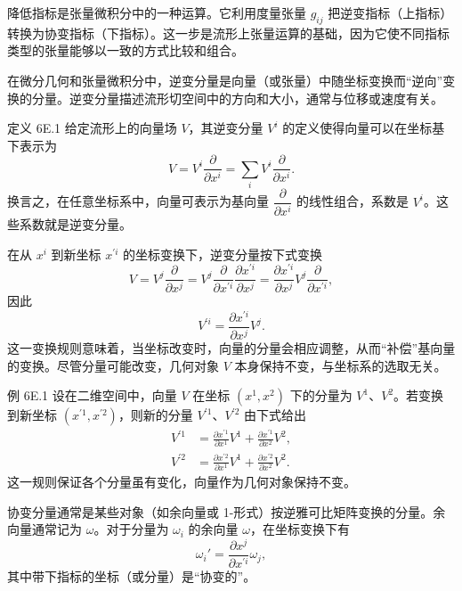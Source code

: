 降低指标是张量微积分中的一种运算。它利用度量张量 $g_{ij}$ 把逆变指标（上指标）转换为协变指标（下指标）。这一步是流形上张量运算的基础，因为它使不同指标类型的张量能够以一致的方式比较和组合。

在微分几何和张量微积分中，逆变分量是向量（或张量）中随坐标变换而“逆向”变换的分量。逆变分量描述流形切空间中的方向和大小，通常与位移或速度有关。

\begin{statement}{定义 6E.1}{}
给定流形上的向量场 $V$，其逆变分量 $V^i$ 的定义使得向量可以在坐标基下表示为
\[
  V=V^i\frac{\partial}{\partial x^i}
    =\sum_i V^i\frac{\partial}{\partial x^i}.
\]
换言之，在任意坐标系中，向量可表示为基向量 $\dfrac{\partial}{\partial x^i}$ 的线性组合，系数是 $V^i$。这些系数就是逆变分量。

在从 $x^i$ 到新坐标 $x^{\prime i}$ 的坐标变换下，逆变分量按下式变换
\[
 V=V^j\frac{\partial}{\partial x^j}
   =V^j\frac{\partial}{\partial x^{\prime i}}
          \frac{\partial x^{\prime i}}{\partial x^j}
   =\frac{\partial x^{\prime i}}{\partial x^j}V^j
        \frac{\partial}{\partial x^{\prime i}},
\]
因此
\[
  V^{\prime i}=\frac{\partial x^{\prime i}}{\partial x^j}V^j.
\]
这一变换规则意味着，当坐标改变时，向量的分量会相应调整，从而“补偿”基向量的变换。尽管分量可能改变，几何对象 $V$ 本身保持不变，与坐标系的选取无关。
\end{statement}

\begin{statement}{例 6E.1}{}
设在二维空间中，向量 $V$ 在坐标 $(x^1,x^2)$ 下的分量为 $V^1$、$V^2$。若变换到新坐标 $(x^{\prime 1},x^{\prime 2})$，则新的分量 $V^{\prime 1}$、$V^{\prime 2}$ 由下式给出
\begin{align*}
  V^{\prime 1}
     &=\frac{\partial x^{\prime 1}}{\partial x^1}V^1
        +\frac{\partial x^{\prime 1}}{\partial x^2}V^2,\\
  V^{\prime 2}
     &=\frac{\partial x^{\prime 2}}{\partial x^1}V^1
        +\frac{\partial x^{\prime 2}}{\partial x^2}V^2.
\end{align*}
这一规则保证各个分量虽有变化，向量作为几何对象保持不变。
\end{statement}

协变分量通常是某些对象（如余向量或 1-形式）按逆雅可比矩阵变换的分量。余向量通常记为 $\omega$。对于分量为 $\omega_i$ 的余向量 $\omega$，在坐标变换下有
\[
  \omega_i'=\frac{\partial x^j}{\partial x^{\prime i}}\omega_j,
\]
其中带下指标的坐标（或分量）是“协变的”。

